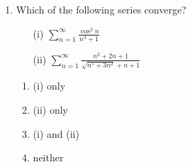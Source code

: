 \documentclass[a4paper,12pt]{article}
\begin{document}
\begin{enumerate}
    \item Which of the following series converge?
        \begin{enumerate}
            \item[(i)] $\sum_{n=1}^{\infty} \frac{\cos^2 n}{n^4+1}$
            \item[(ii)] $\sum_{n=1}^{\infty} \frac{n^2+2n+1}{\sqrt{n^5+3n^2}+n+1}$
         \end{enumerate}
         \begin{enumerate}
            \item (i) only
            \item (ii) only
            \item (i) and (ii)
            \item neither
        \end{enumerate}
\end{enumerate}
\end{document}
